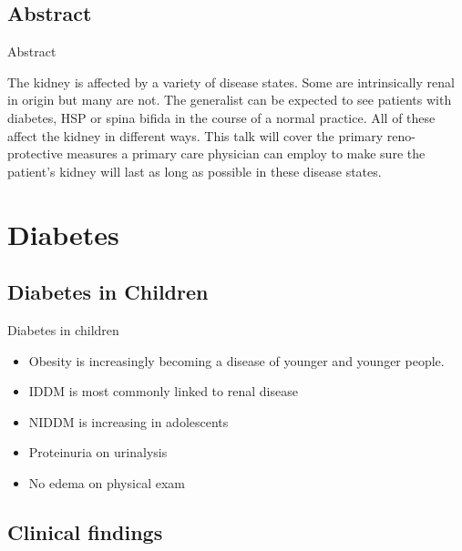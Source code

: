 \subsection{Abstract}\label{abstract}

\begin{frame}{Abstract}

The kidney is affected by a variety of disease states. Some are
intrinsically renal in origin but many are not. The generalist can be
expected to see patients with diabetes, HSP or spina bifida in the
course of a normal practice. All of these affect the kidney in different
ways. This talk will cover the primary reno-protective measures a
primary care physician can employ to make sure the patient's kidney will
last as long as possible in these disease states.

\end{frame}

\section{Diabetes}\label{diabetes}

\frame{\tableofcontents[hideothersubsections]}

\subsection{Diabetes in Children}\label{diabetes-in-children}

\begin{frame}{Diabetes in children}

\begin{itemize}
\itemsep1pt\parskip0pt
\item
  Obesity is increasingly becoming a disease of younger and younger
  people.
\item
  IDDM is most commonly linked to renal disease
\item
  NIDDM is increasing in adolescents
\item
  Proteinuria on urinalysis
\item
  No edema on physical exam
\end{itemize}

\end{frame}

\subsection{Clinical findings}\label{clinical-findings}

